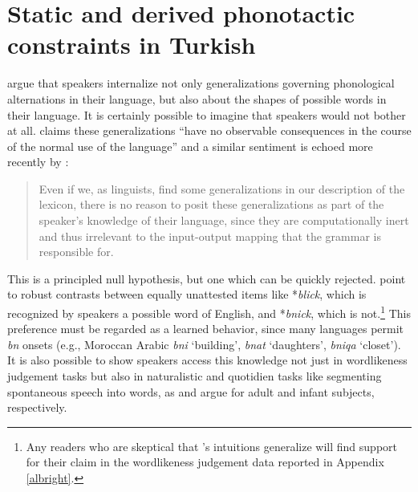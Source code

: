 \chapter{Static and derived phonotactic constraints in Turkish} 
\label{turkish}


\citet{Chomsky1965} argue that speakers internalize not only generalizations governing phonological alternations in their language, but also about the shapes of possible words in their language. It is certainly possible to imagine that speakers would not bother at all. \citet[][320]{Zimmer1969} claims these generalizations ``have no observable consequences in the course of the normal use of the language'' and a similar sentiment is echoed more recently by \citeauthor{PE}:

\begin{quote}
Even if we, as linguists, find some generalizations in our description of the lexicon, there is no reason to posit these generalizations as part of the speaker's knowledge of their language, since they are computationally inert and thus irrelevant to the input-output mapping that the grammar is responsible for. \citep[][18]{PE}
\end{quote}

This is a principled null hypothesis, but one which can be quickly rejected. \citeauthor{Chomsky1965} point to robust contrasts between equally unattested items like *\emph{blick}, which is recognized by speakers a possible word of English, and *\emph{bnick}, which is not.\footnote{Any readers who are skeptical that \citeauthor{Chomsky1965}'s intuitions generalize will find support for their claim in the wordlikeness judgement data reported in Appendix \ref{albright}.}
This preference must be regarded as a learned behavior, since many languages permit  \emph{bn} onsets (e.g., Moroccan Arabic \emph{bni} `building', \emph{bnat} `daughters', \emph{bniqa} `closet'). It is also possible to show speakers access this knowledge not just in wordlikeness judgement tasks but also in naturalistic and quotidien tasks like segmenting spontaneous speech into words, as \citet{McQueen1998} and \citet{Mattys2001b} argue for adult and infant subjects, respectively.

